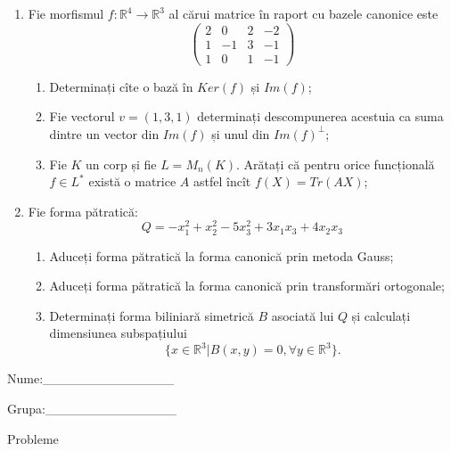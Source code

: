 \documentclass{article}
\begin{document}
\begin{enumerate}
 \item Fie morfismul $f:\mathbb{R}^4 \to \mathbb{R}^3$ al cărui matrice în raport cu bazele canonice este
$$\begin{pmatrix}
2&0&2&-2\\
1&-1&3&-1\\
1&0&1&-1
\end{pmatrix}$$

\begin{enumerate}
\item Determinați cîte o bază în $Ker(f)$ și $Im(f)$;
\item Fie vectorul $v=(1,3,1)$ determinați descompunerea acestuia ca suma dintre un vector din $Im(f)$ și unul din $Im(f)^\perp$;
\item Fie $K$ un corp și fie $L=M_n(K)$. Arătați că pentru orice funcțională $f \in L^*$ există o matrice $A$ astfel încît $f(X)=Tr(AX)$;
\end{enumerate}
\item Fie forma pătratică:
$$Q= -x_1^2+x_2^2-5x_3^2+3x_1x_3+4x_2x_3$$

\begin{enumerate}
\item Aduceți forma pătratică la forma canonică prin metoda Gauss;
\item Aduceți forma pătratică la forma canonică prin transformări ortogonale;
\item Determinați forma biliniară simetrică $B$ asociată lui $Q$ și calculați dimensiunea subspațiului
$$\{x \in \mathbb{R}^3 | B(x,y)=0,\forall y \in \mathbb{R}^3\}.$$

\end{enumerate}
\end{enumerate}
\newpage
\begin{flushright}
Nume:\_\_\_\_\_\_\_\_\_\_\_\_\_\_
 
 
Grupa:\_\_\_\_\_\_\_\_\_\_\_\_\_\_
\end{flushright}
\begin{center}
\vspace{2cm}
{\Large Probleme}
\vspace{2cm}
\end{center}
\end{document}
